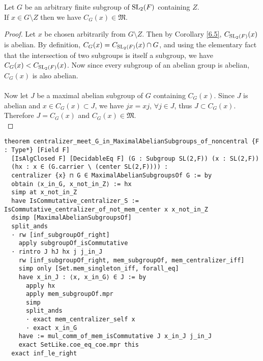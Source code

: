 \begin{theorem}
  \label{MaximalAbelianSubgroup.centralizer_meet_G_in_MaximalAbelianSubgroups_of_noncentral}
  \leanok 
  Let $G$ be an arbitrary finite subgroup of $\operatorname{SL}_2(F)$ containing $Z$. \\
If $x \in G \! \setminus \! Z$ then we have $C_G(x) \in \mathfrak{M}$. \vspace{3mm} \\
\end{theorem}
\begin{proof}
  \leanok
  Let $x$ be chosen arbitrarily from $G \! \setminus \! Z$. Then by Corollary \ref{6.5}, $C_{\operatorname{SL}_2(F)}(x)$ is abelian. By definition, $C_G(x) = C_{\operatorname{SL}_2(F)}(x) \cap G$, 
  and using the elementary fact that the intersection of two subgroups is itself a subgroup, we have $C_G(x) < C_{\operatorname{SL}_2(F)}(x)$. Now since every subgroup of an abelian group is abelian, $C_G(x)$ is also abelian. \\
  \\
  Now let $J$ be a maximal abelian subgroup of $G$ containing $C_G(x)$. Since $J$ is abelian and $x \in C_G(x) \subset J$, we have $jx=xj$, $\forall j \in J$, thus $J \subset C_G(x)$. Therefore $J=C_G(x)$ and $C_G(x) \in \mathfrak{M}$. \\
\end{proof}
\begin{footnotesize}
\begin{verbatim}
theorem centralizer_meet_G_in_MaximalAbelianSubgroups_of_noncentral {F : Type*} [Field F]
  [IsAlgClosed F] [DecidableEq F] (G : Subgroup SL(2,F)) (x : SL(2,F))
  (hx : x ∈ (G.carrier \ (center SL(2,F)))) :
  centralizer {x} ⊓ G ∈ MaximalAbelianSubgroupsOf G := by
  obtain ⟨x_in_G, x_not_in_Z⟩ := hx
  simp at x_not_in_Z
  have IsCommutative_centralizer_S := IsCommutative_centralizer_of_not_mem_center x x_not_in_Z
  dsimp [MaximalAbelianSubgroupsOf]
  split_ands
  · rw [inf_subgroupOf_right]
    apply subgroupOf_isCommutative
  · rintro J hJ hx j j_in_J
    rw [inf_subgroupOf_right, mem_subgroupOf, mem_centralizer_iff]
    simp only [Set.mem_singleton_iff, forall_eq]
    have x_in_J : ⟨x, x_in_G⟩ ∈ J := by
      apply hx
      apply mem_subgroupOf.mpr
      simp
      split_ands
      · exact mem_centralizer_self x
      · exact x_in_G
    have := mul_comm_of_mem_isCommutative J x_in_J j_in_J
    exact SetLike.coe_eq_coe.mpr this
  exact inf_le_right
\end{verbatim}
\end{footnotesize}


